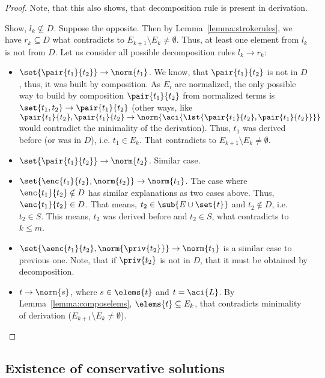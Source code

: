 \begin{prop}
\begin{proof}
	Note, that this also shows, that decomposition rule is present in derivation.
	
	Show, $l_k\nsubseteq D$. Suppose the opposite. Then by Lemma~\ref{lemma:strokerules}, we have $r_k\subseteq D$ what contradicts to $E_{k+1}\setminus E_k \neq \emptyset$.
	Thus, at least one element from $l_k$ is not from $D$.
	Let us consider all possible decomposition rules $l_k\rightarrow r_k$:
	\begin{itemize}
		\item $\set{\pair{t_1}{t_2}} \rightarrow \norm{t_1}$. We know, that $\pair{t_1}{t_2}$ is not in $D$, thus, it was built by composition. As $E_i$ are normalized, the only possible way to build by composition $\pair{t_1}{t_2}$ from normalized terms is $\set{t_1,t_2}\rightarrow \pair{t_1}{t_2}$ (other ways, like $\pair{t_1}{t_2}, \pair{t_1}{t_2} \rightarrow \norm{\aci{\lst{\pair{t_1}{t_2}, \pair{t_1}{t_2}}}}$ would contradict the minimality of the derivation). 
		Thus, $t_1$ was derived before (or was in $D$), i.e. $t_1 \in E_k$. 
		That contradicts to $E_{k+1}\setminus E_k \neq \emptyset$.
		
		\item  $\set{\pair{t_1}{t_2}} \rightarrow \norm{t_2}$. Similar case.
		
		\item $\set{\enc{t_1}{t_2},  \norm{t_2}} \rightarrow \norm{t_1}$. The case where $\enc{t_1}{t_2}\notin D$ has similar explanations as two cases above. Thus, $\enc{t_1}{t_2}\in D$. That means, $t_2\in\sub{E\cup\set{t}}$ and 
		 $t_2\notin D$, i.e. $t_2\in S$. 
This means, $t_2$ was derived before and $t_2\in S$, what contradicts to  $k\leq m$.
		
\item $\set{\aenc{t_1}{t_2},  \norm{\priv{t_2}}} \rightarrow \norm{t_1}$ is a similar case to previous one. Note, that if $\priv{t_2}$ is not in $D$, that it must be obtained by decomposition.
		
		\item ${t} \rightarrow \norm{s}$, where $s\in\elems{t}$ and $t=\aci{L}$. By Lemma~\ref{lemma:composelems}, $\elems{t}\subseteq E_k$, that contradicts minimality of derivation ($E_{k+1}\setminus E_k \neq \emptyset$).
	\end{itemize}

	
\end{proof}
\end{prop}



\subsection{Existence of conservative solutions}

